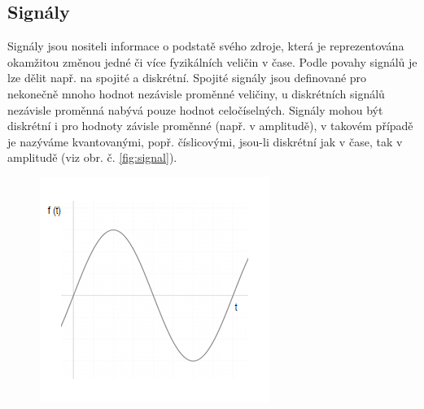 \documentclass[a4paper, 12pt]{article}
\begin{document}
\subsection{Signály} \label{sec:signal}
Signály jsou nositeli informace o podstatě svého zdroje, která je reprezentována okamžitou změnou jedné či více fyzikálních veličin v čase. \cite{uhlíř&sovka2002} Podle povahy signálů je lze dělit např. na spojité a diskrétní. Spojité signály jsou definované pro nekonečně mnoho hodnot nezávisle proměnné veličiny, u diskrétních signálů nezávisle proměnná nabývá pouze hodnot celočíselných. Signály mohou být diskrétní i pro hodnoty závisle proměnné (např. v amplitudě), v takovém případě je nazýváme kvantovanými, popř. číslicovými, jsou-li diskrétní jak v čase, tak v amplitudě (viz obr. č. \ref{fig:signal}).
\begin{figure}[ht!]
\centering
\begin{minipage}[c]{5cm}
  \centering
  \includegraphics[width=\linewidth]{analogový.png}
  \subcaption{}
\end{minipage}\hspace{1cm}
\begin{minipage}[c]{5cm}
  \centering

\end{minipage}
\end{figure}
\end{document}
